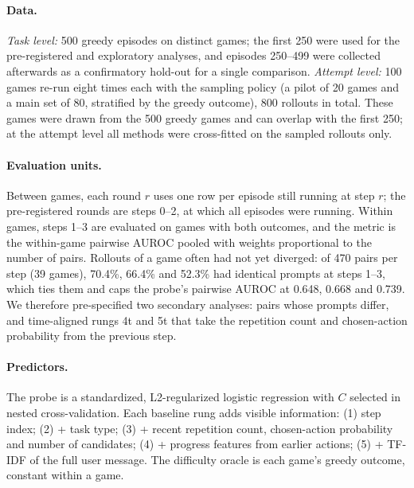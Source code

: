 \documentclass[10pt]{article}
\begin{document}
\paragraph{Data.} \emph{Task level:} 500 greedy episodes on distinct games; the first 250 were used for the pre-registered and exploratory analyses, and episodes 250--499 were collected afterwards as a confirmatory hold-out for a single comparison.
\emph{Attempt level:} 100 games re-run eight times each with the sampling policy (a pilot of 20 games and a main set of 80, stratified by the greedy outcome), 800 rollouts in total. These games were drawn from the 500 greedy games and can overlap with the first 250; at the attempt level all methods were cross-fitted on the sampled rollouts only.

\paragraph{Evaluation units.} Between games, each round $r$ uses one row per episode still running at step $r$; the pre-registered rounds are steps 0--2, at which all episodes were running. Within games, steps 1--3 are evaluated on games with both outcomes, and the metric is the within-game pairwise AUROC pooled with weights proportional to the number of pairs.
Rollouts of a game often had not yet diverged: of 470 pairs per step (39 games), 70.4\%, 66.4\% and 52.3\% had identical prompts at steps 1--3, which ties them and caps the probe's pairwise AUROC at 0.648, 0.668 and 0.739.
We therefore pre-specified two secondary analyses: pairs whose prompts differ, and time-aligned rungs 4t and 5t that take the repetition count and chosen-action probability from the previous step.

\paragraph{Predictors.} The probe is a standardized, L2-regularized logistic regression with $C$ selected in nested cross-validation. Each baseline rung adds visible information: (1) step index; (2) + task type; (3) + recent repetition count, chosen-action probability and number of candidates; (4) + progress features from earlier actions; (5) + TF-IDF of the full user message.
The difficulty oracle is each game's greedy outcome, constant within a game.
\end{document}
